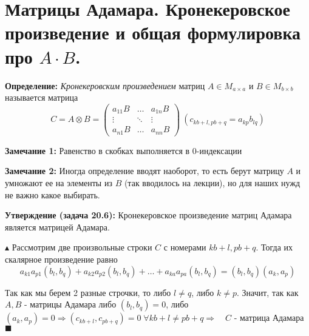 \setcounter{section}{52}
\section{Матрицы Адамара. Кронекеровское произведение и общая формулировка про $A \cdot B$.}
\par \textbf{Определение:} \textit{Кронекеровским произведением} матриц $A \in M_{a \times a}$ и $B \in M_{b \times b}$ называется матрица $$C=A \otimes B =
\left(
\begin{array}{ccc}
a_{11}B & \ldots & a_{1n}B\\
\vdots & \ddots & \vdots\\
a_{n1}B & \ldots & a_{nn}B
\end{array}
\right) \: (c_{kb+l, pb+q}=a_{kp} b_{lq})$$
\par \textbf{Замечание 1:} Равенство в скобках выполняется в 0-индексации
\par \textbf{Замечание 2:} Иногда определение вводят наоборот, то есть берут матрицу $A$ и умножают ее на элементы из $B$ (так вводилось на лекции), но для наших нужд не важно какое выбирать.
\par \textbf{Утверждение (задача 20.6):} Кронекеровское произведение матриц Адамара является матрицей Адамара.
\par $\blacktriangle$ Рассмотрим две произвольные строки $C$ с номерами $kb+l, pb+q$. Тогда их скалярное произведение равно
$$a_{k1}a_{p1}(b_l, b_q) + a_{k2}a_{p2}(b_l, b_q) + \ldots + a_{ka}a_{pa}(b_l, b_q) = (b_l, b_q)(a_k, a_p)$$
\par Так как мы берем 2 разные строчки, то либо $l \neq q$, либо $k \neq p$. Значит, так как $A, B$ - матрицы Адамара либо $(b_l, b_q)=0$, либо $(a_k, a_p)=0 \Rightarrow (c_{kb+l}, c_{pb+q})=0 \; \forall kb+l \neq pb+q \Rightarrow \quad C$ - матрица Адамара $\blacksquare$